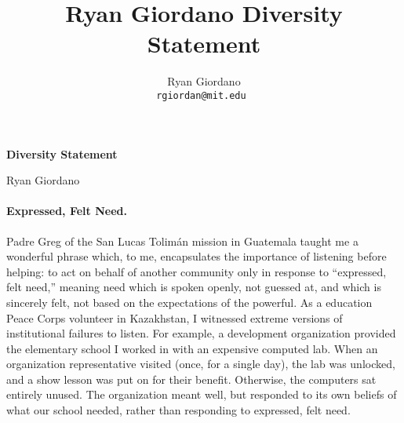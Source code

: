 
\usepackage{enumitem}

\usepackage{geometry}
\geometry{top=1.3in}
\geometry{left=1.0in}
\geometry{right=1.0in}


\title{Ryan Giordano Diversity Statement}

\author{
  Ryan Giordano \\ \texttt{rgiordan@mit.edu }
}



\begin{minipage}[t]{0.5\textwidth}
\hspace{-2em} %
{\bf \LARGE Diversity Statement}\\
\end{minipage}
\begin{minipage}[t]{0.5\textwidth}
        \hspace{8em} %
        {\LARGE Ryan Giordano}
\end{minipage}



%


\paragraph{Expressed, Felt Need.}
%
Padre Greg of the San Lucas Tolimán mission in Guatemala taught me a wonderful
phrase which, to me, encapsulates the importance of listening before helping: to
act on behalf of another community only in response to ``expressed, felt need,''
meaning need which is spoken openly, not guessed at, and which is sincerely
felt, not based on the expectations of the powerful.  As a education Peace Corps
volunteer in Kazakhstan, I witnessed extreme versions of institutional failures
to listen. For example, a development organization provided the elementary
school I worked in with an expensive computed lab.  When an organization
representative visited (once, for a single day), the lab was unlocked, and a
show lesson was put on for their benefit.  Otherwise, the computers sat entirely
unused. The organization meant well, but responded to its own beliefs of what
our school needed, rather than responding to expressed, felt need.

